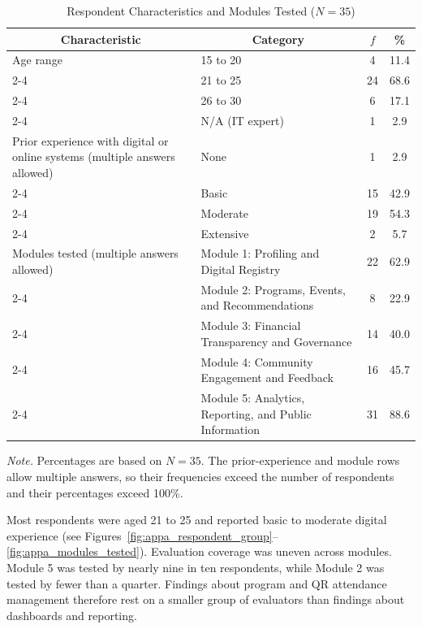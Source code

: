 \begin{table}[H]
\centering
\small
\caption{Respondent Characteristics and Modules Tested ($N = 35$)}
\label{tab:respondent_characteristics_modules_tested}
\begin{tabular}{|p{4.0cm}|p{4.2cm}|c|c|}
\hline
\multicolumn{1}{|c|}{\textbf{Characteristic}} & \multicolumn{1}{c|}{\textbf{Category}} & \textbf{$f$} & \textbf{\%} \\ \hline
Age range & 15 to 20 & 4 & 11.4 \\ \cline{2-4}
 & 21 to 25 & 24 & 68.6 \\ \cline{2-4}
 & 26 to 30 & 6 & 17.1 \\ \cline{2-4}
 & N/A (IT expert) & 1 & 2.9 \\ \hline
Prior experience with digital or online systems (multiple answers allowed) & None & 1 & 2.9 \\ \cline{2-4}
 & Basic & 15 & 42.9 \\ \cline{2-4}
 & Moderate & 19 & 54.3 \\ \cline{2-4}
 & Extensive & 2 & 5.7 \\ \hline
Modules tested (multiple answers allowed) & Module 1: Profiling and Digital Registry & 22 & 62.9 \\ \cline{2-4}
 & Module 2: Programs, Events, and Recommendations & 8 & 22.9 \\ \cline{2-4}
 & Module 3: Financial Transparency and Governance & 14 & 40.0 \\ \cline{2-4}
 & Module 4: Community Engagement and Feedback & 16 & 45.7 \\ \cline{2-4}
 & Module 5: Analytics, Reporting, and Public Information & 31 & 88.6 \\ \hline
\end{tabular}
\end{table}
\vspace{2mm}

\noindent\textit{Note.} Percentages are based on $N = 35$. The prior-experience and module rows allow multiple answers, so their frequencies exceed the number of respondents and their percentages exceed 100\%.
\vspace{3mm}

\hspace*{\parindent}Most respondents were aged 21 to 25 and reported basic to moderate digital experience (see Figures~\ref{fig:appa_respondent_group}--\ref{fig:appa_modules_tested}). Evaluation coverage was uneven across modules. Module 5 was tested by nearly nine in ten respondents, while Module 2 was tested by fewer than a quarter. Findings about program and QR attendance management therefore rest on a smaller group of evaluators than findings about dashboards and reporting.
\vspace{5mm}

